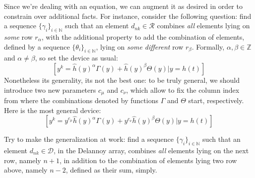 \documentclass[11pt,a4paper]{article} %
\begin{document}
    Since we're dealing with an equation, we can augment it as desired in order to
    constrain over additional facts. For instance, consider the following question:
    find a sequence $\lbrace \gamma_{i} \rbrace_{i\in\mathbb{N}}$ such that 
    an element $d_{nk}\in\mathcal{R}$ combines \emph{all} elements lying on 
    \emph{some} row $r_\alpha$, with the additional property to add the combination of 
    elements, defined by a sequence $\lbrace \theta_{i} \rbrace_{i\in\mathbb{N}}$, 
    lying on \emph{some different} row $r_\beta$. Formally, $\alpha,\beta\in\mathbb{Z}$ 
    and $\alpha \not=\beta$, so set the device as usual:
    \begin{displaymath}
        \left[y^{k} = \hat{h}(y)^{\alpha} \Gamma(y) + \hat{h}(y)^{\beta} \Theta(y) \big| y = h(t) \right]
    \end{displaymath}
    Nonetheless its generality, its not the best one: to be truly general,
    we should introduce two new parameters $c_\mu$ and $c_\nu$, which allow
    to fix the column index from where the combinations denoted by functions
    $\Gamma$ and $\Theta$ start, respectively. Here is the most general device:
    \begin{displaymath}
        \left[y^{k} = y^{c_\mu}\hat{h}(y)^{\alpha} \Gamma(y) + 
            y^{c_\nu}\hat{h}(y)^{\beta} \Theta(y) \big| y = h(t) \right]
    \end{displaymath}

    Try to make the generalization at work:
    find a sequence $\lbrace \gamma_{i} \rbrace_{i\in\mathbb{N}}$ such that 
    an element $d_{nk}\in\mathcal{D}$, in the Delannoy array, 
    combines \emph{all} elements lying on 
    the next row, namely $n+1$, in addition to the
    combination of elements lying two row above, namely $n-2$, 
    defined as their sum, simply. 
\end{document}
